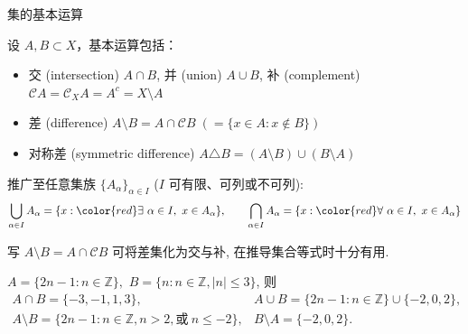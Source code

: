 \begin{frame}{集的基本运算}

设 $A, B \subset X$，基本运算包括：

\pause

\begin{itemize}
\item \alert{交} (intersection) $A \cap B$, \quad \alert{并} (union) $A \cup B$, \quad \alert{补} (complement) $\mathscr{C} A = \mathscr{C}_X A = A^c = X \setminus A$
\item \alert{差} (difference) $A \setminus B = A \cap \mathscr{C}B \;(= \{x \in A : x \notin B\})$
\item \alert{对称差} (symmetric difference) $A \triangle B = (A \setminus B) \cup (B \setminus A)$
\end{itemize}

\pause
\vspace{0.5em}

推广至任意集族 $\{A_\alpha\}_{\alpha \in I}$ ($I$ 可有限、可列或不可列):
\[
\bigcup_{\alpha \in I} A_\alpha = \{x : {\color{red}\exists} ~ \alpha \in I,\ x \in A_\alpha\},
\qquad
\bigcap_{\alpha \in I} A_\alpha = \{x : {\color{red}\forall} ~ \alpha \in I,\ x \in A_\alpha\}
\]

\pause
\vspace{0.5em}

\begin{remark}
写 $A \setminus B = A \cap \mathscr{C}B$ 可将差集化为交与补, 在推导集合等式时十分有用.
\end{remark}

\pause
\vspace{0.5em}

\begin{eg}
$A = \{ 2n - 1 : n \in \mathbb{Z} \},$ $B = \{ n : n \in \mathbb{Z}, |n| \leqslant 3 \}$, 则
\[
\begin{array}{ll}
A \cap B = \{-3, -1, 1, 3\},  & A \cup B = \{2n - 1 : n \in \mathbb{Z}\} \cup \{-2, 0, 2\}, \\
A \setminus B = \{2n - 1 : n \in \mathbb{Z}, n > 2, \text{或} ~ n \leqslant -2\}, & B \setminus A = \{-2, 0, 2\}.
\end{array}
\]
\end{eg}

\end{frame}


